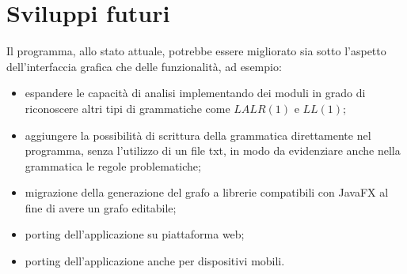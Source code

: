 \documentclass[12pt]{article}
\begin{document}
\section{Sviluppi futuri}
Il programma, allo stato attuale, potrebbe essere migliorato sia sotto l'aspetto dell'interfaccia grafica che delle funzionalità, ad esempio:
\begin{itemize}
\item espandere le capacità di analisi implementando dei moduli in grado di riconoscere altri tipi di grammatiche come $LALR \left( 1 \right)$ e $LL \left( 1 \right)$;
\item aggiungere la possibilità di scrittura della grammatica direttamente nel programma, senza l'utilizzo di un file txt, in modo da evidenziare anche nella grammatica le regole problematiche;
\item migrazione della generazione del grafo a librerie compatibili con JavaFX al fine di avere un grafo editabile;
\item porting dell'applicazione su piattaforma web;
\item porting dell'applicazione anche per dispositivi mobili.
\end{itemize}
\end{document}
